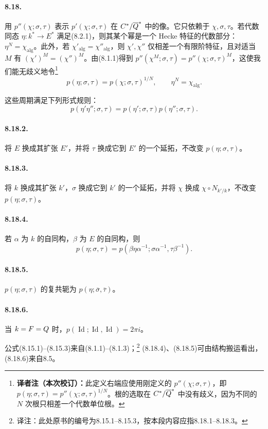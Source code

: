 \paragraph*{8.18.}
用 $p''(\chi;\sigma,\tau)$ 表示 $p'(\chi;\sigma,\tau)$ 在 $C^*/\overline{Q}^*$ 中的像。它只依赖于 $\chi,\sigma,\tau$。若代数同态 $\eta:k^*\longrightarrow E^*$ 满足(8.2.1)，则其某个幂是一个 Hecke 特征的代数部分：$\eta^N=\chi_{\mathrm{alg}}$。此外，若 $\chi'_{\mathrm{alg}}=\chi''_{\mathrm{alg}}$，则 $\chi',\chi''$ 仅相差一个有限阶特征，且对适当 $M$ 有 $(\chi')^M=(\chi'')^M$。由(8.1.1)得到
$p''(\chi^M;\sigma,\tau)=p''(\chi;\sigma,\tau)^M$，这使我们能无歧义地令\footnote{\textbf{译者注（本次校订）：}此定义右端应使用刚定义的 $p''(\chi;\sigma,\tau)$，即 $p(\eta;\sigma,\tau)=p''(\chi;\sigma,\tau)^{1/N}$。根的选取在 $C^*/\overline{Q}^*$ 中没有歧义，因为不同的 $N$ 次根只相差一个代数单位根。}
\[
 p(\eta;\sigma,\tau)=p(\chi;\sigma,\tau)^{1/N},
 \qquad\eta^N=\chi_{\mathrm{alg}}.
\]

这些周期满足下列形式规则：
\[
 p(\eta'\eta'';\sigma,\tau)
 =p(\eta';\sigma,\tau)p(\eta'';\sigma,\tau).\tag{8.18.1}
\]
\paragraph*{8.18.2.}
将 $E$ 换成其扩张 $E'$，并将 $\tau$ 换成它到 $E'$ 的一个延拓，不改变 $p(\eta;\sigma,\tau)$。
\paragraph*{8.18.3.}
将 $k$ 换成其扩张 $k'$，$\sigma$ 换成它到 $k'$ 的一个延拓，并将 $\chi$ 换成 $\chi\circ N_{k'/k}$，不改变 $p(\eta;\sigma,\tau)$。
\paragraph*{8.18.4.}
若 $\alpha$ 为 $k$ 的自同构，$\beta$ 为 $E$ 的自同构，则
\[
 p(\eta;\sigma,\tau)=p(\beta\eta\alpha^{-1};\sigma\alpha^{-1},\tau\beta^{-1}).
\]
\paragraph*{8.18.5.}
$p(\eta;\sigma,\tau)$ 的复共轭为 $p(\eta;\overline\sigma,\overline\tau)$。
\paragraph*{8.18.6.}
当 $k=F=Q$ 时，$p(\operatorname{Id};\operatorname{Id},\operatorname{Id})=2\pi i$。

公式(8.15.1)--(8.15.3)来自(8.1.1)--(8.1.3)；\footnote{译注：此处原书的编号为8.15.1--8.15.3，按本段内容应指8.18.1--8.18.3。} (8.18.4)、(8.18.5)可由结构搬运看出，(8.18.6)来自8.5。

